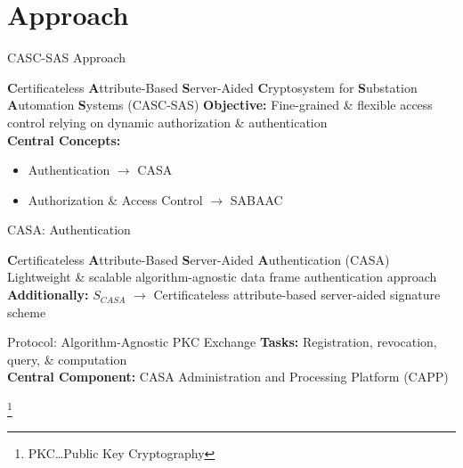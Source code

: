 \documentclass[en]{sdqbeamer}
\newcommand\nonumberfootnote[1]{%
  \begingroup
  \renewcommand\thefootnote{}\footnote{#1}%
  \addtocounter{footnote}{-1}%
  \endgroup
}
\begin{document}
\section{Approach}
\begin{frame}{CASC-SAS Approach}
    \begin{greenblock}{\textbf{C}ertificateless \textbf{A}ttribute-Based \textbf{S}erver-Aided \textbf{C}ryptosystem for \textbf{S}ubstation \textbf{A}utomation \textbf{S}ystems (CASC-SAS)}
        \textbf{Objective:} Fine-grained \& flexible access control relying on dynamic authorization \& authentication
        \\\textbf{Central Concepts:}
        \begin{itemize}
            \item Authentication $\rightarrow$ CASA
            \item Authorization \& Access Control $\rightarrow$ SABAAC
        \end{itemize}
    \end{greenblock}
\end{frame}
\begin{frame}{CASA: Authentication}
    \begin{greenblock}{\textbf{C}ertificateless \textbf{A}ttribute-Based \textbf{S}erver-Aided \textbf{A}uthentication (CASA)}
        Lightweight \& scalable algorithm-agnostic data frame authentication approach
        \\\textbf{Additionally:} $S_{CASA}$ $\rightarrow$ Certificateless attribute-based server-aided signature scheme
    \end{greenblock}
    \begin{blueblock}{Protocol: Algorithm-Agnostic PKC Exchange}
        \textbf{Tasks:} Registration, revocation, query, \& computation
        \\\textbf{Central Component:} CASA Administration and Processing Platform (CAPP)
    \end{blueblock}
    \nonumberfootnote{PKC\dots Public Key Cryptography}
\end{frame}
\end{document}
